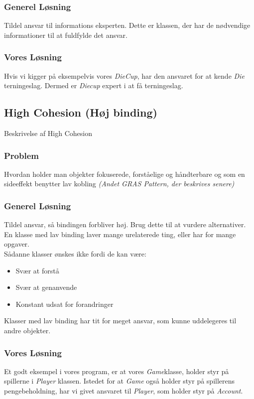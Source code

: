 \subsubsection{Generel Løsning}
Tildel ansvar til informations eksperten. Dette er klassen, der har de nødvendige informationer til at fuldfylde det ansvar.
\subsubsection{Vores Løsning}
Hvis vi kigger på eksempelvis vores \textit{DieCup}, har den ansvaret for at kende \textit{Die} terningeslag. Dermed er \textit{Diecup} expert i at få terningeslag.
\subsection{High Cohesion (Høj binding)}
Beskrivelse af High Cohesion
\subsubsection{Problem}
Hvordan holder man objekter fokuserede, forståelige og håndterbare og som en sideeffekt benytter lav kobling \textit{(Andet GRAS Pattern, der beskrives senere)}
\subsubsection{Generel Løsning}
Tildel ansvar, så bindingen forbliver høj. Brug dette til at vurdere alternativer.
\\
En klasse med lav binding laver mange urelaterede ting, eller har for mange opgaver.
\\
Sådanne klasser ønskes ikke fordi de kan være:
\begin{itemize}
\item Svær at forstå
\item Svær at genanvende
\item Konstant udsat for forandringer
\end{itemize}
Klasser med lav binding har tit for meget ansvar, som kunne uddelegeres til andre objekter.
\subsubsection{Vores Løsning}
Et godt eksempel i vores program, er at vores \textit{Game}klasse,  holder styr på spillerne i \textit{Player} klassen. Istedet for at \textit{Game} også holder styr på spillerens pengebeholdning, har vi givet ansvaret til \textit{Player}, som holder styr på \textit{Account}.
